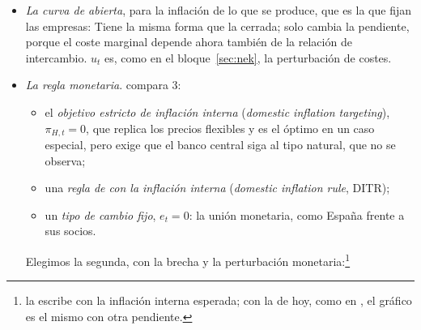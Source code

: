 \documentclass[11pt]{article}
\begin{document}
\begin{itemize}
\begin{itemize}
  \item \emph{En palabras}: es la IS del bloque~\ref{sec:nek} con un coeficiente distinto, $\theta_{\alpha G}$ (local), que recoge 2~cosas. La \emph{apertura}: si las elasticidades son altas ($\Theta>0$), una subida de tipos, además de aplazar consumo, aprecia la moneda y resta exportaciones, y la brecha es más sensible al tipo de interés. Y el \emph{gasto público}, el parámetro que añade : como solo el consumo privado responde al tipo real, cuanto más pesa el Estado, menos responde la demanda ($1-s_G$). Con $\alpha=0$ y $s_G=0$ es la IS cerrada.
  \item \emph{El tipo natural} depende ahora del gasto público y del mundo: sube con el gasto, $r^n_t=\rho+\frac{\theta_{\alpha G}\,\varphi\,(1-\rho_g)}{\theta_{\alpha G}+\varphi}\,\hat g_t+\ldots$, y con el crecimiento esperado de la producción mundial, y baja con una mejora tecnológica transitoria (anexo~\ref{anexo:nek}).
  \end{itemize}
\item \emph{La curva de  abierta}, para la inflación de lo que se produce, que es la que fijan las empresas:
  Tiene la misma forma que la cerrada; solo cambia la pendiente, porque el coste marginal depende ahora también de la relación de intercambio. $u_t$ es, como en el bloque~\ref{sec:nek}, la perturbación de costes.
\item \emph{La regla monetaria}. \textcite{Furlanetto2006Fiscal} compara 3:
  \begin{itemize}
  \item el \emph{objetivo estricto de inflación interna} (\emph{domestic inflation targeting}), $\pi_{H,t}=0$, que replica los precios flexibles y es el óptimo en un caso especial, pero exige que el banco central siga al tipo natural, que no se observa;
  \item una \emph{regla de  con la inflación interna} (\emph{domestic inflation  rule}, DITR);
  \item un \emph{tipo de cambio fijo}, $e_t=0$: la unión monetaria, como España frente a sus socios.
  \end{itemize}
  Elegimos la segunda, con la brecha y la perturbación monetaria:\footnote{\textcite{Furlanetto2006Fiscal} la escribe con la inflación interna esperada; con la de hoy, como en \textcite{GaliMonacelli2005Monetary}, el gráfico es el mismo con otra pendiente.}

\end{itemize}
\end{document}
